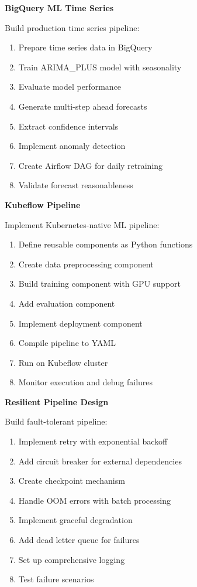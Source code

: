 \begin{exercise}
\textbf{BigQuery ML Time Series}

Build production time series pipeline:

\begin{enumerate}
    \item Prepare time series data in BigQuery
    \item Train ARIMA\_PLUS model with seasonality
    \item Evaluate model performance
    \item Generate multi-step ahead forecasts
    \item Extract confidence intervals
    \item Implement anomaly detection
    \item Create Airflow DAG for daily retraining
    \item Validate forecast reasonableness
\end{enumerate}
\end{exercise}

\begin{exercise}
\textbf{Kubeflow Pipeline}

Implement Kubernetes-native ML pipeline:

\begin{enumerate}
    \item Define reusable components as Python functions
    \item Create data preprocessing component
    \item Build training component with GPU support
    \item Add evaluation component
    \item Implement deployment component
    \item Compile pipeline to YAML
    \item Run on Kubeflow cluster
    \item Monitor execution and debug failures
\end{enumerate}
\end{exercise}

\begin{exercise}
\textbf{Resilient Pipeline Design}

Build fault-tolerant pipeline:

\begin{enumerate}
    \item Implement retry with exponential backoff
    \item Add circuit breaker for external dependencies
    \item Create checkpoint mechanism
    \item Handle OOM errors with batch processing
    \item Implement graceful degradation
    \item Add dead letter queue for failures
    \item Set up comprehensive logging
    \item Test failure scenarios
\end{enumerate}
\end{exercise}
